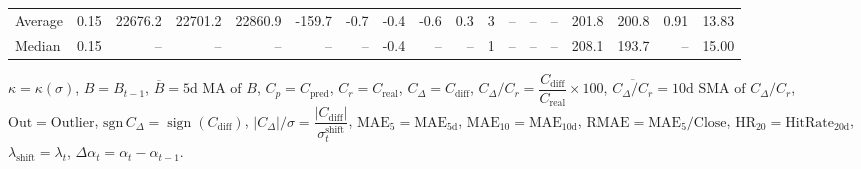 \begin{threeparttable}
{\begin{tabular}{lrrrrrrrrrrrrrrrrr}
Average &     0.15 & 22676.2 & 22701.2 & 22860.9 &     -159.7 &           -0.7 &                      -0.4 &                     -0.6 &                 0.3 &              3 &         -- &        -- &             -- &            201.8 &               200.8 &            0.91 &                  13.83 \\
 Median &     0.15 &      -- &      -- &      -- &         -- &             -- &                      -0.4 &                       -- &                  -- &              1 &         -- &        -- &             -- &            208.1 &               193.7 &              -- &                  15.00 \\
\bottomrule
\end{tabular}
}
\begin{tablenotes}\footnotesize
\item $\kappa=\kappa(\sigma)$, $B=B_{t-1}$, $\overline{B}=\text{5d MA of }B$, $C_p=C_{\text{pred}}$, $C_r=C_{\text{real}}$, $C_\Delta=C_{\text{diff}}$, $C_\Delta/C_r=\dfrac{C_{\text{diff}}}{C_{\text{real}}}\times100$, $\overline{C_\Delta/C_r}=\text{10d SMA of }C_\Delta/C_r$, $\mathrm{Out}=\text{Outlier}$, $\mathrm{sgn}\,C_\Delta=\operatorname{sign}(C_{\text{diff}})$, $|C_\Delta|/\sigma=\dfrac{|C_{\text{diff}}|}{\sigma_t^{\text{shift}}}$, $\mathrm{MAE}_5=\mathrm{MAE}_{5\text{d}}$, $\mathrm{MAE}_{10}=\mathrm{MAE}_{10\text{d}}$, $\mathrm{RMAE}= \mathrm{MAE}_5 / \text{Close}$, $\mathrm{HR}_{20}=\mathrm{HitRate}_{20\text{d}}$, $\lambda_{\text{shift}}=\lambda_t$, $\Delta\alpha_t=\alpha_t-\alpha_{t-1}$.
\end{tablenotes}
\end{threeparttable}
\endgroup

